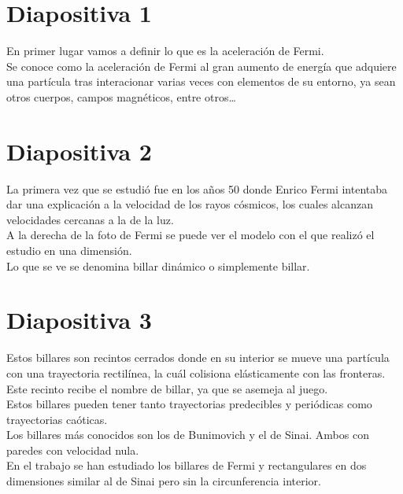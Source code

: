 \documentclass[11pt, spanish]{article}
\begin{document}
\section{Diapositiva 1}

En primer lugar vamos a definir lo que es la aceleración de Fermi. \\

Se conoce como la aceleración de Fermi al gran aumento de energía que adquiere una partícula tras interacionar varias veces con elementos de su entorno, ya sean otros cuerpos, campos magnéticos, entre otros\dots \\


\section{Diapositiva 2}

La primera vez que se estudió fue en los años 50 donde Enrico Fermi intentaba dar una explicación a la velocidad de los rayos cósmicos, los cuales alcanzan velocidades cercanas a la de la luz. \\ 

A la derecha de la foto de Fermi se puede ver el modelo con el que realizó el estudio en una dimensión. \\

Lo que se ve se denomina billar dinámico o simplemente billar. 


\section{Diapositiva 3}

Estos billares son recintos cerrados donde en su interior se mueve una partícula con una trayectoria rectilínea, la cuál colisiona elásticamente con las fronteras. Este recinto recibe el nombre de billar, ya que se asemeja al juego. \\

Estos billares pueden tener tanto trayectorias predecibles y periódicas como trayectorias caóticas. \\

Los billares más conocidos son los de Bunimovich y el de Sinai. Ambos con paredes con velocidad nula. \\

En el trabajo se han estudiado los billares de Fermi y rectangulares en dos dimensiones similar al de Sinai pero sin la circunferencia interior. 
\end{document}
